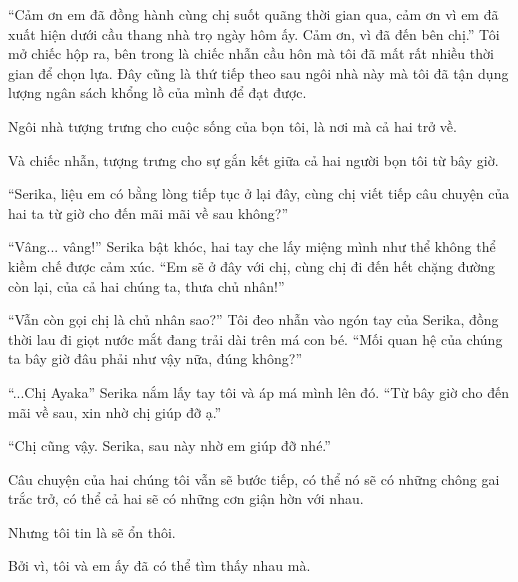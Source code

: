 {``Cảm ơn em đã đồng hành cùng chị suốt quãng thời gian qua, cảm ơn vì em
đã xuất hiện dưới cầu thang nhà trọ ngày hôm ấy. Cảm ơn, vì đã đến bên
chị.'' Tôi mở chiếc hộp ra, bên trong là chiếc nhẫn cầu hôn mà tôi đã
mất rất nhiều thời gian để chọn lựa. Đây cũng là thứ tiếp theo sau ngôi
nhà này mà tôi đã tận dụng lượng ngân sách khổng lồ của mình để đạt
được.

Ngôi nhà tượng trưng cho cuộc sống của bọn tôi, là nơi mà cả hai trở về.

Và chiếc nhẫn, tượng trưng cho sự gắn kết giữa cả hai người bọn tôi từ
bây giờ.

``Serika, liệu em có bằng lòng tiếp tục ở lại đây, cùng chị viết tiếp
câu chuyện của hai ta từ giờ cho đến mãi mãi về sau không?''

``Vâng... vâng!'' Serika bật khóc, hai tay che lấy miệng mình như thể
không thể kiềm chế được cảm xúc. ``Em sẽ ở đây với chị, cùng chị đi đến
hết chặng đường còn lại, của cả hai chúng ta, thưa chủ nhân!''

``Vẫn còn gọi chị là chủ nhân sao?'' Tôi đeo nhẫn vào ngón tay của
Serika, đồng thời lau đi giọt nước mắt đang trải dài trên má con bé.
``Mối quan hệ của chúng ta bây giờ đâu phải như vậy nữa, đúng không?''

``...Chị Ayaka'' Serika nắm lấy tay tôi và áp má mình lên đó. ``Từ bây
giờ cho đến mãi về sau, xin nhờ chị giúp đỡ ạ.''

``Chị cũng vậy. Serika, sau này nhờ em giúp đỡ nhé.''

Câu chuyện của hai chúng tôi vẫn sẽ bước tiếp, có thể nó sẽ có những
chông gai trắc trở, có thể cả hai sẽ có những cơn giận hờn với nhau.

Nhưng tôi tin là sẽ ổn thôi.

Bởi vì, tôi và em ấy đã có thể tìm thấy nhau mà.

}